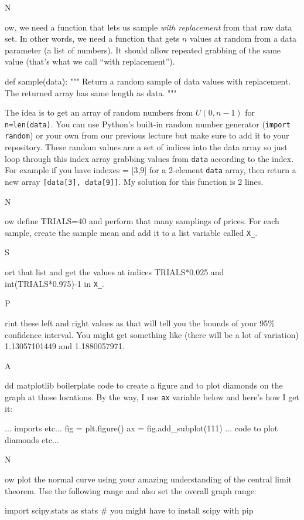 \documentclass[titlepage]{tufte-book}
\newcounter{problem}
\newcommand{\step}[1]{{}
\vspace{4pt} \noindent {\bf \theproblem. }#1\addtocounter{problem}{1}}
\begin{document}
\begin{fullwidth}
\step Now, we need a function that lets us sample {\em with replacement} from that raw data set. In other words, we need a function that gets $n$ values at random from a data parameter (a list of numbers). It should allow repeated grabbing of the same value (that's what we call ``with replacement'').

\begin{pyverbatim}
def sample(data):
	"""
	Return a random sample of data values with replacement.
	The returned array has same length as data.
	"""
\end{pyverbatim}

The idea is to get an array of random numbers from $U(0,n-1)$ for {\tt n=len(data)}. You can use Python's built-in random number generator ({\tt import random}) or your own from our previous lecture but make sure to add it to your repository.  These random values are a set of indices into the data array so just loop through this index array grabbing values from {\tt data} according to the index. For example if you have indexes = [3,9] for a 2-element {\tt data} array, then return a new array {\tt [data[3], data[9]]}. My solution for this  function is 2 lines.

\step Now define TRIALS=40 and perform that many samplings of prices. For each sample, create the sample mean and add it to a list variable called {\tt X\_}.

\step Sort that list and get the values at indices TRIALS*0.025 and int(TRIALS*0.975)-1 in {\tt X\_}.

\step Print these left and right values as that will tell you the bounds of your 95\% confidence interval. You might get something like (there will be a lot of variation) 1.13057101449 and 1.1880057971.

\step Add matplotlib boilerplate code to create a figure and to plot diamonds on the graph at those locations.  By the way, I use {\tt ax} variable below and here's how I get it:
\begin{pyverbatim}
... imports etc...
fig = plt.figure()
ax = fig.add_subplot(111)
... code to plot diamonds etc... 
\end{pyverbatim}

\step Now plot the normal curve using your amazing understanding of the central limit  theorem. Use the following range and also set the overall graph range:

\begin{pyverbatim}
import scipy.stats as stats # you might have to install scipy with pip


\end{pyverbatim}
\end{fullwidth}
\end{document}
